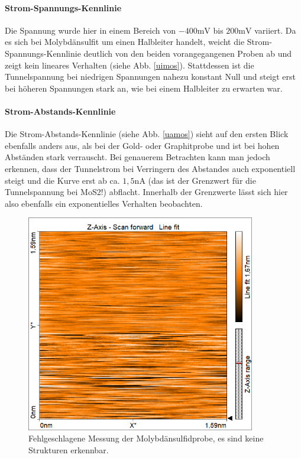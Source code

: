 \paragraph{Strom-Spannungs-Kennlinie}
Die Spannung wurde hier in einem Bereich von $-400\si{\milli\volt}$ bis $200\si{\milli\volt}$ variiert.
Da es sich bei Molybdänsulfit um einen Halbleiter handelt, weicht die Strom-Spannungs-Kennlinie deutlich von den beiden vorangegangenen Proben ab und zeigt kein lineares Verhalten (siehe Abb. \ref{uimos}). Stattdessen ist die Tunnelspannung bei niedrigen Spannungen nahezu konstant Null und steigt erst bei höheren Spannungen stark an, wie bei einem Halbleiter zu erwarten war.
\paragraph{Strom-Abstands-Kennlinie}
Die Strom-Abstands-Kennlinie (siehe Abb. \ref{uamos}) sieht auf den ersten Blick ebenfalls anders aus, als bei der Gold- oder Graphitprobe und ist bei hohen Abständen stark verrauscht. Bei genauerem Betrachten kann man jedoch erkennen, dass der Tunnelstrom bei Verringern des Abstandes auch exponentiell steigt und die Kurve erst ab ca. $1,5\si{\nano\ampere}$ (das ist der Grenzwert für die Tunnelspannung bei MoS2!) abflacht. Innerhalb der Grenzwerte lässt sich hier also ebenfalls ein exponentielles Verhalten beobachten.

\begin{figure}[H]
	\begin{center}
		\includegraphics[width=10cm]{Mess/mos_oberfl.png}
		\caption{Fehlgeschlagene Messung der Molybdänsulfidprobe, es sind keine Strukturen erkennbar.}
		\label{mos_oberfl}
	\end{center}
\end{figure} 




